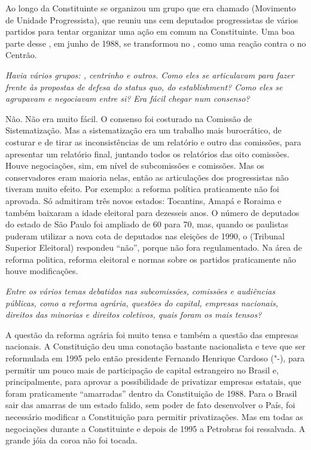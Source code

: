 Ao longo da Constituinte se organizou um grupo que era chamado 
(Movimento de Unidade Progressista), que reuniu uns cem deputados
progressistas de vários partidos para tentar organizar uma ação em comum
na Constituinte. Uma boa parte desse , em junho de 1988, se
transformou no , como uma reação contra o  no Centrão.

\medskip

\noindent\emph{Havia vários grupos: , centrinho e outros. Como eles se
articulavam para fazer frente às propostas de defesa do status quo, do
establishment? Como eles se agrupavam e negociavam entre si? Era fácil
chegar num consenso?}

Não. Não era muito fácil. O consenso foi costurado
na Comissão de Sistematização. Mas a sistematização era um trabalho mais
burocrático, de costurar e de tirar as inconsistências de um relatório e
outro das comissões, para apresentar um relatório final, juntando todos
os relatórios das oito comissões. Houve negociações, sim, em nível de
subcomissões e comissões. Mas os conservadores eram maioria nelas, então
as articulações dos progressistas não tiveram muito efeito. Por exemplo:
a reforma política praticamente não foi aprovada. Só admitiram três
novos estados: Tocantins, Amapá e Roraima e também baixaram a idade
eleitoral para dezesseis anos. O número de deputados do estado de São
Paulo foi ampliado de 60 para 70, mas, quando os paulistas puderam
utilizar a nova cota de deputados nas eleições de 1990, o  (Tribunal
Superior Eleitoral) respondeu ``não'', porque não fora regulamentado. Na
área de reforma politica, reforma eleitoral e normas sobre os partidos
praticamente não houve modificações.

\medskip

\noindent\emph{Entre os vários temas debatidos nas subcomissões, comissões e
audiências públicas, como a reforma agrária, questões do capital,
empresas nacionais, direitos das minorias e direitos coletivos, quais
foram os mais tensos?}

A questão da reforma agrária foi muito tensa e
também a questão das empresas nacionais. A Constituição deu uma
conotação bastante nacionalista e teve que ser reformulada em 1995 pelo
então presidente Fernando Henrique Cardoso ("-), para permitir um
pouco mais de participação de capital estrangeiro no Brasil e,
principalmente, para aprovar a possibilidade de privatizar empresas
estatais, que foram praticamente ``amarradas'' dentro da Constituição de
1988. Para o Brasil sair das amarras de um estado falido, sem poder de
fato desenvolver o País, foi necessário modificar a Constituição para
permitir privatizações. Mas em todas as negociações durante a
Constituinte e depois de 1995 a Petrobras foi ressalvada. A grande jóia
da coroa não foi tocada.

